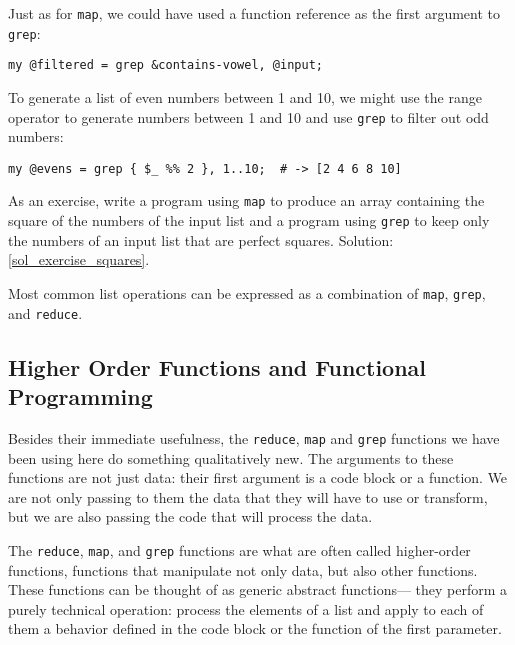 Just as for {\tt map}, we could have used a function 
reference as the first argument to  {\tt grep}:

\begin{verbatim}
my @filtered = grep &contains-vowel, @input;
\end{verbatim}
%

To generate a list of even numbers between 1 and 10, we might 
use the range operator to generate numbers between 1 and 10 
and use {\tt grep} to filter out odd numbers:

\begin{verbatim}
my @evens = grep { $_ %% 2 }, 1..10;  # -> [2 4 6 8 10]
\end{verbatim}
%

\label{exercise_squares}
As an exercise, write a program using {\tt map} to 
produce an array containing the square of the numbers 
of the input list and a program using {\tt grep} to keep 
only the numbers of an input list that are perfect squares. Solution: \ref{sol_exercise_squares}.

Most common list operations can be expressed as a combination
of {\tt map}, {\tt grep}, and {\tt reduce}.

\subsection{Higher Order Functions and Functional Programming}
\label{array_functional_programming}

Besides their immediate usefulness, the {\tt reduce}, {\tt map} 
and {\tt grep} functions we have been using here do something 
qualitatively new. The arguments to these functions are not 
just data: their first argument is a code block or a function. 
We are not only passing to them the data that they will have 
to use or transform, but we are also passing the code 
that will process the data.


The {\tt reduce}, {\tt map}, and {\tt grep} functions are 
what are often called higher-order functions, functions that 
manipulate not only data, but also other functions. These 
functions can be thought of as generic abstract functions--- 
they perform a purely technical operation: process the  
elements of a list and apply to each of them a behavior 
defined in the code block or the function of the first 
parameter.

